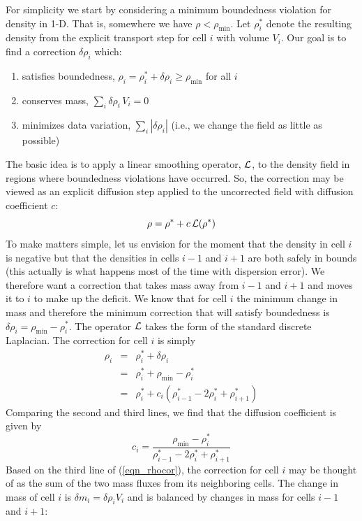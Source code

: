 For simplicity we start by considering a minimum boundedness violation for density in 1-D.  That is, somewhere we have $\rho < \rho_{\min}$.  Let $\rho_i^*$ denote the resulting density from the explicit transport step for cell $i$ with volume $V_i$.  Our goal is to find a correction $\delta \rho_i$ which:
\begin{enumerate}[{(}a{)}]
\item satisfies boundedness, $\rho_i = \rho_i^* + \delta \rho_i \ge \rho_{\min}$ for all $i$
\item conserves mass, $\sum_i \delta \rho_i \, V_i = 0$
\item minimizes data variation, $\sum_i |\delta \rho_i|$ (i.e., we change the field as little as possible)
\end{enumerate}
The basic idea is to apply a linear smoothing operator, $\cal L$, to the density field in regions where boundedness violations have occurred. So, the correction may be viewed as an explicit diffusion step applied to the uncorrected field with diffusion coefficient $c$:
\begin{equation}
\rho = \rho^* + c \, {\cal L} (\rho^*)
\end{equation}
To make matters simple, let us envision for the moment that the density in cell $i$ is negative but that the densities in cells $i-1$ and $i+1$ are both safely in bounds (this actually is what happens most of the time with dispersion error).  We therefore want a correction that takes mass away from $i-1$ and $i+1$ and moves it to $i$ to make up the deficit.  We know that for cell $i$ the minimum change in mass and therefore the minimum correction that will satisfy boundedness is $\delta \rho_i = \rho_{\min} - \rho_i^*$.  The operator $\cal L$ takes the form of the standard discrete Laplacian.  The correction for cell $i$ is simply
\begin{eqnarray}
\label{eqn_rhocor}
\rho_i &=& \rho_i^* + \delta \rho_i \nonumber\\
&=& \rho_i^* + \rho_{\min} - \rho_i^* \nonumber\\
&=&  \rho_i^* + c_i (\rho_{i-1}^* - 2 \rho_i^* + \rho_{i+1}^*)
\end{eqnarray}
Comparing the second and third lines, we find that the diffusion coefficient is given by
\begin{equation}
\label{eqn_diffcoef}
c_i = \frac{\rho_{\min} - \rho_i^*}{\rho_{i-1}^* - 2 \rho_i^* + \rho_{i+1}^*}
\end{equation}
Based on the third line of (\ref{eqn_rhocor}), the correction for cell $i$ may be thought of as the sum of the two mass fluxes from its neighboring cells.  The change in mass of cell $i$ is $\delta m_i = \delta \rho_i V_i$ and is balanced by changes in mass for cells $i-1$ and $i+1$:
